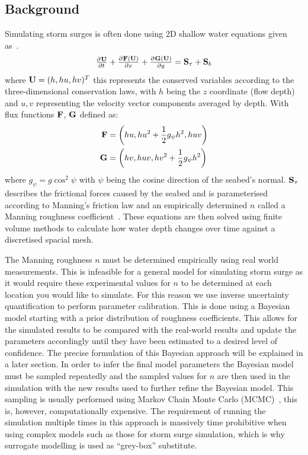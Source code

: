 \documentclass[12pt,a4paper]{article}
\begin{document}
\subsection{Background}\label{sec:back}
\noindent
Simulating storm surges is often done using 2D shallow water equations given as~\cite{equation}.
\begin{equation}
	\pd{{\bf U}}{t}+\pd{{\bf F(U)}}{x}+\pd{{\bf G(U)}}{y}={\bf S}_\tau+{\bf S}_b
\end{equation}
where ${\bf U}=(h,hu,hv)^T$ this represents the conserved variables according to the three-dimensional conservation laws, with $h$ being the $z$ coordinate (flow depth) and $u, v$ representing the velocity vector components averaged by depth. With flux functions ${\bf F}$, ${\bf G}$ defined as:
\begin{align}
	{\bf F} &= \left( hu,hu^2+\frac{1}{2}g_\psi h^2,huv \right) \\
	{\bf G} &= \left( hv,huv,hv^2+\frac{1}{2}g_\psi h^2 \right)
\end{align}
where $g_\psi=g\cos^2\psi$ with $\psi$ being the cosine direction of the seabed's normal. ${\bf S}_\tau$ describes the frictional forces caused by the seabed and is parameterised according to Manning's friction law and an empirically determined $n$ called a Manning roughness coefficient~\cite{manning}. These equations are then solved using finite volume methods to calculate how water depth changes over time against a discretised spacial mesh.

The Manning roughness $n$ must be determined empirically using real world measurements. This is infeasible for a general model for simulating storm surge as it would require these experimental values for $n$ to be determined at each location you would like to simulate. For this reason we use inverse uncertainty quantification to perform parameter calibration. This is done using a Bayesian model starting with a prior distribution of roughness coefficients. This allows for the simulated results to be compared with the real-world results and update the parameters accordingly until they have been estimated to a desired level of confidence. The precise formulation of this Bayesian approach will be explained in a later section. In order to infer the final model parameters the Bayesian model must be sampled repeatedly and the sampled values for $n$ are then used in the simulation with the new results used to further refine the Bayesian model. This sampling is usually performed using Markov Chain Monte Carlo (MCMC)~\cite{mcmcpopular}, this is, however, computationally expensive. The requirement of running the simulation multiple times in this approach is massively time prohibitive when using complex models such as those for storm surge simulation, which is why surrogate modelling is used as ``grey-box'' substitute.
\end{document}
